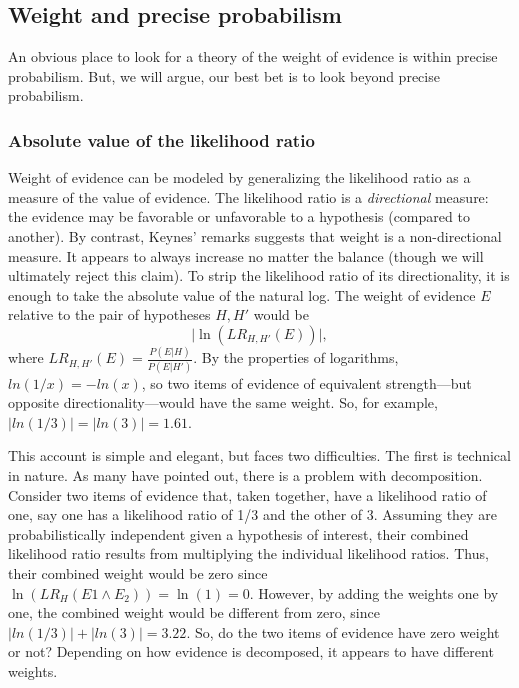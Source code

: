\documentclass[
  10pt,
  dvipsnames,enabledeprecatedfontcommands]{scrartcl}
\begin{document}
\hypertarget{weight-and-precise-probabilism}{%
\subsection{Weight and precise
probabilism}\label{weight-and-precise-probabilism}}

An obvious place to look for a theory of the weight of evidence is
within precise probabilism. But, we will argue, our best bet is to look
beyond precise probabilism.

\hypertarget{absolute-value-of-the-likelihood-ratio}{%
\subsubsection{Absolute value of the likelihood
ratio}\label{absolute-value-of-the-likelihood-ratio}}

Weight of evidence can be modeled by generalizing the likelihood ratio
as a measure of the value of evidence. The likelihood ratio is a
\emph{directional} measure: the evidence may be favorable or unfavorable
to a hypothesis (compared to another). By contrast, Keynes' remarks
suggests that weight is a non-directional measure. It appears to always
increase no matter the balance (though we will ultimately reject this
claim). To strip the likelihood ratio of its directionality, it is
enough to take the absolute value of the natural log.
The weight of evidence \(E\) relative to the pair of hypotheses
\(H, H'\) would be \[\vert \ln (LR_{H, H'}(E)) \vert, \] where
\(LR_{H, H'}(E)=\frac{P(E \vert H)}{P(E \vert H')}\). By the properties
of logarithms, \(ln(1/x) = -ln(x)\), so two items of evidence of
equivalent strength---but opposite directionality---would have the same
weight. So, for example, \(|ln(1/3)|= |ln(3)| = 1.61\).

This account is simple and elegant, but faces two difficulties. The
first is technical in nature. As many have pointed out, there is a
problem with decomposition. Consider two items of evidence that, taken
together, have a likelihood ratio of one, say one has a likelihood ratio
of 1/3 and the other of 3. Assuming they are probabilistically
independent given a hypothesis of interest, their combined likelihood
ratio results from multiplying the individual likelihood ratios. Thus,
their combined weight would be zero since
\(\ln (LR_H(E1 \wedge E_2))=\ln (1) = 0\). However, by adding the
weights one by one, the combined weight would be different from zero,
since \(|ln(1/3)| + |ln(3)| = 3.22\). So, do the two items of evidence
have zero weight or not? Depending on how evidence is decomposed, it
appears to have different weights.
\end{document}
